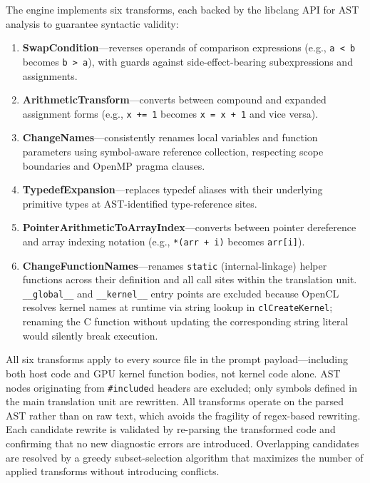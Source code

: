 \documentclass[conference]{IEEEtran}
\begin{document}
The engine implements six transforms, each backed by the libclang API for AST analysis to guarantee syntactic validity:
\begin{enumerate}
    \item \textbf{SwapCondition}---reverses operands of comparison expressions (e.g., \texttt{a < b} becomes \texttt{b > a}), with guards against side-effect-bearing subexpressions and assignments.
    
    \item \textbf{ArithmeticTransform}---converts between compound and expanded assignment forms (e.g., \texttt{x += 1} becomes \texttt{x = x + 1} and vice versa). 
    
    \item \textbf{ChangeNames}---consistently renames local variables and function parameters using symbol-aware reference collection, respecting scope boundaries and OpenMP pragma clauses.
    
    \item \textbf{TypedefExpansion}---replaces typedef aliases with their underlying primitive types at AST-identified type-reference sites.
    \item \textbf{PointerArithmeticToArrayIndex}---converts between pointer dereference and array indexing notation (e.g., \texttt{*(arr + i)} becomes \texttt{arr[i]}).
    
    \item \textbf{ChangeFunctionNames}---renames \texttt{static} (internal-linkage) helper functions across their definition and all call sites within the translation unit. \texttt{\_\_global\_\_} and \texttt{\_\_kernel\_\_} entry points are excluded because OpenCL resolves kernel names at runtime via string lookup in \texttt{clCreateKernel}; renaming the C function without updating the corresponding string literal would silently break execution.
\end{enumerate}

All six transforms apply to every source file in the prompt payload---including both host code and GPU kernel function bodies, not kernel code alone. AST nodes originating from \texttt{\#include}d headers are excluded; only symbols defined in the main translation unit are rewritten. All transforms operate on the parsed AST rather than on raw text, which avoids the fragility of regex-based rewriting. Each candidate rewrite is validated by re-parsing the transformed code and confirming that no new diagnostic errors are introduced. Overlapping candidates are resolved by a greedy subset-selection algorithm that maximizes the number of applied transforms without introducing conflicts.
\end{document}
